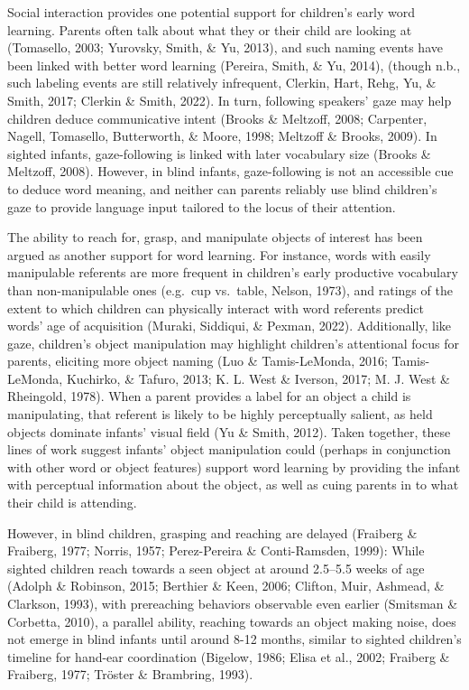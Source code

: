 \documentclass[
  man,floatsintext]{apa6}
\begin{document}
Social interaction provides one potential support for children's early word learning. Parents often talk about what they or their child are looking at (Tomasello, 2003; Yurovsky, Smith, \& Yu, 2013), and such naming events have been linked with better word learning (Pereira, Smith, \& Yu, 2014), (though n.b., such labeling events are still relatively infrequent, Clerkin, Hart, Rehg, Yu, \& Smith, 2017; Clerkin \& Smith, 2022). In turn, following speakers' gaze may help children deduce communicative intent (Brooks \& Meltzoff, 2008; Carpenter, Nagell, Tomasello, Butterworth, \& Moore, 1998; Meltzoff \& Brooks, 2009). In sighted infants, gaze-following is linked with later vocabulary size (Brooks \& Meltzoff, 2008). However, in blind infants, gaze-following is not an accessible cue to deduce word meaning, and neither can parents reliably use blind children's gaze to provide language input tailored to the locus of their attention.

The ability to reach for, grasp, and manipulate objects of interest has been argued as another support for word learning. For instance, words with easily manipulable referents are more frequent in children's early productive vocabulary than non-manipulable ones (e.g.~cup vs.~table, Nelson, 1973), and ratings of the extent to which children can physically interact with word referents predict words' age of acquisition (Muraki, Siddiqui, \& Pexman, 2022). Additionally, like gaze, children's object manipulation may highlight children's attentional focus for parents, eliciting more object naming (Luo \& Tamis-LeMonda, 2016; Tamis-LeMonda, Kuchirko, \& Tafuro, 2013; K. L. West \& Iverson, 2017; M. J. West \& Rheingold, 1978). When a parent provides a label for an object a child is manipulating, that referent is likely to be highly perceptually salient, as held objects dominate infants' visual field (Yu \& Smith, 2012). Taken together, these lines of work suggest infants' object manipulation could (perhaps in conjunction with other word or object features) support word learning by providing the infant with perceptual information about the object, as well as cuing parents in to what their child is attending.

However, in blind children, grasping and reaching are delayed (Fraiberg \& Fraiberg, 1977; Norris, 1957; Perez-Pereira \& Conti-Ramsden, 1999): While sighted children reach towards a seen object at around 2.5--5.5 weeks of age (Adolph \& Robinson, 2015; Berthier \& Keen, 2006; Clifton, Muir, Ashmead, \& Clarkson, 1993), with prereaching behaviors observable even earlier (Smitsman \& Corbetta, 2010), a parallel ability, reaching towards an object making noise, does not emerge in blind infants until around 8-12 months, similar to sighted children's timeline for hand-ear coordination (Bigelow, 1986; Elisa et al., 2002; Fraiberg \& Fraiberg, 1977; Tröster \& Brambring, 1993).
\end{document}
